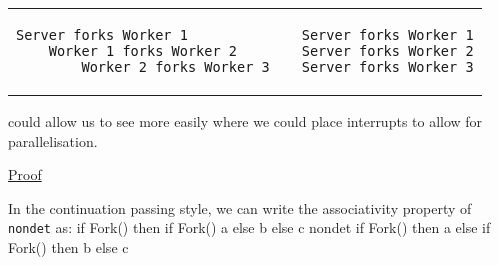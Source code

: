 \documentclass[logo,bsc,singlespacing,parskip]{infthesis}
\begin{document}
\vspace{-1em} %
\begin{table}[h]
\centering
\begin{tabular}{p{} c p{}}
\begin{lstlisting}
Server forks Worker 1
    Worker 1 forks Worker 2
        Worker 2 forks Worker 3
\end{lstlisting}
&
&
\begin{lstlisting}
Server forks Worker 1
Server forks Worker 2
Server forks Worker 3
\end{lstlisting}
\end{tabular}
\end{table}
\vspace{-1em} %
could allow us to see more easily where we could place interrupts to allow for parallelisation.




\underline{Proof}

In the continuation passing style, we can write the associativity property of \texttt{nondet} as:
{
if Fork() then
if Fork() 
a 
else 
b 
else 
c
}
{nondet}
{
if Fork() then a 
else 
if Fork() 
 then b 
 else c
}
\end{document}
